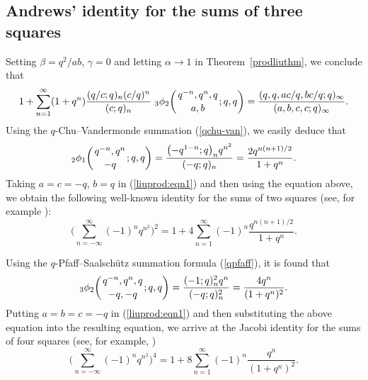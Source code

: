 \documentclass[10pt,a4paper]{amsart}
\numberwithin{equation}{section}
\begin{document}
\subsection{Andrews' identity for the sums of three squares}
Setting $\beta=q^2/ab$, $\gamma=0$ and letting $\alpha \to 1$ in Theorem~\ref{prodliuthm}, we conclude that
\begin{align}\label{liuprod:eqn1}
	1+\sum_{n=1}^\infty (1+q^n)\frac{(q/c; q)_n (c/q)^n}{(c; q)_n}~ {_3 \phi_2} \biggl({{q^{-n}, q^n, q}
		\atop{ a, b}}; q, q\biggr)
	=\frac{(q, q, ac/q, bc/q; q)_\infty}{(a, b, c, c; q )_\infty}.
\end{align}
Using the $q$-Chu--Vandermonde summation (\ref{qchu-van}), we easily deduce that
\begin{equation}\label{liuprod:eqn2}
	{_2\phi_1}\biggl({{q^{-n}, q^n}
		\atop{-q}}; q, q\biggr)=\frac{\bigl(-q^{1-n}; q\bigr)_n q^{n^2}}{(-q; q)_n}
	=\frac{2q^{n(n+1)/2}}{1+q^n}.
\end{equation}	
Taking $a=c=-q$, $b=q$ in (\ref{liuprod:eqn1}) and then using the equation above, we obtain the following well-known identity for the sums of two squares (see, for example \cite[equation~(3.35)]{Andrews74}):
\begin{equation*}%
\Biggl(\sum_{n=-\infty}^\infty (-1)^n q^{n^2}\Biggr)^{2}=1+4\sum_{n=1}^\infty (-1)^n\frac{q^{n(n+1)/2}}{1+q^n}.
\end{equation*}

Using the $q$-Pfaff--Saalsch\"utz summation formula (\ref{qpfaff}), it is found that
\begin{equation*}%
	{_{3}\phi_{2}}\biggl({{q^{-n}, q^n, q}
		\atop{-q, -q}}; q, q\biggr)=\frac{(-1; q)^2_n q^n}{(-q; q)^2_n}=\frac{4q^n}{(1+q^n)^2}.
\end{equation*}	
Putting $a=b=c=-q$ in (\ref{liuprod:eqn1}) and then substituting the above equation into the resulting equation, we arrive at
the Jacobi identity for the sums of four squares (see, for example, \cite[equation~(3.40)]{Andrews74})
\begin{equation*}	%
	\Biggl(\sum_{n=-\infty}^\infty (-1)^n q^{n^2}\Biggr)^{4}=1+8\sum_{n=1}^\infty (-1)^n\frac{q^n}{(1+q^n)^2}.
\end{equation*}
\end{document}
